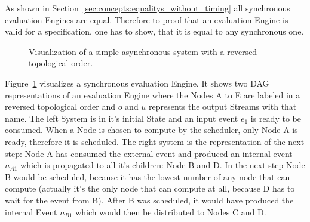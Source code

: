 As shown in Section~\ref{sec:concepts:equalitys_without_timing} all synchronous evaluation Engines are equal.
Therefore to proof that an evaluation Engine is valid for a specification, one has to show, that it is equal to any synchronous one.


\begin{figure}
  \caption{Visualization of a simple asynchronous system with a reversed topological order.}
\label{fig:chap3:sec_sync:visual_dag}
\end{figure}


Figure~\ref{fig:chap3:sec_sync:visual_dag} visualizes a synchronous evaluation Engine.
It shows two DAG representations of an evaluation Engine  where the Nodes A to E are labeled in a reversed topological order and \(o\) and \(u\) represents the output Streams with that name.
The left System is in it's initial State and an input event \(e_1\) is ready to be consumed.
When a Node is chosen to compute by the scheduler, only Node A is ready, therefore it is scheduled.
The right system is the representation of the next step: Node A has consumed the external event and produced an internal event \(n_{A1}\) which is propagated to all it's children: Node B and D.
In the next step Node B would be scheduled, because it has the lowest number of any node that can compute (actually it's the only node that can compute at all, because D has to wait for the event from B).
After B was scheduled, it would have produced the internal Event \(n_{B1}\) which would then be distributed to Nodes C and D.

